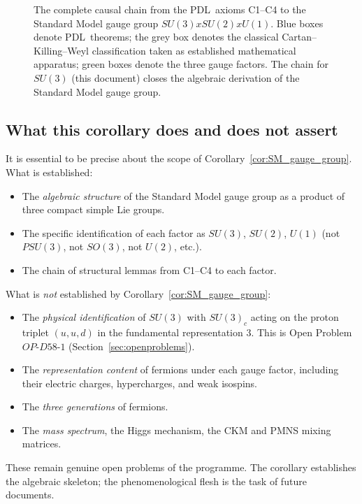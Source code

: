 \documentclass[11pt,a4paper]{article}
\def\SUthree{SU(3)}%
\def\SUtwo{SU(2)}%
\def\Uone{U(1)}%
\def\PSUthree{PSU(3)}%
\def\PDL{PDL}%
\def\times{x}%
\def\mathrm#1{#1}%
\def\mathbf#1{#1}%
\def\textsc#1{#1}%
\theoremstyle{plain}
\theoremstyle{definition}
\theoremstyle{remark}
\newcommand{\PDL}{\textsc{PDL}}
\newcommand{\SUthree}{\mathrm{SU}(3)}
\newcommand{\SUtwo}{\mathrm{SU}(2)}
\newcommand{\Uone}{\mathrm{U}(1)}
\newcommand{\PSUthree}{\mathrm{PSU}(3)}
\begin{document}
\begin{figure}[H]
{%
}
\caption{The complete causal chain from the \PDL\ axioms C1--C4 to the Standard Model gauge group $\SUthree \times \SUtwo \times \Uone$. Blue boxes denote \PDL\ theorems; the grey box denotes the classical Cartan--Killing--Weyl classification taken as established mathematical apparatus; green boxes denote the three gauge factors. The chain for $\SUthree$ (this document) closes the algebraic derivation of the Standard Model gauge group.}
\label{fig:gauge_group_chain}
\end{figure}

\subsection{What this corollary does and does not assert}

It is essential to be precise about the scope of Corollary~\ref{cor:SM_gauge_group}. What is established:
\begin{itemize}[leftmargin=2em]
\item The \emph{algebraic structure} of the Standard Model gauge group as a product of three compact simple Lie groups.
\item The specific identification of each factor as $\SUthree$, $\SUtwo$, $\Uone$ (not $\PSUthree$, not $\mathrm{SO}(3)$, not $\mathrm{U}(2)$, etc.).
\item The chain of structural lemmas from C1--C4 to each factor.
\end{itemize}
What is \emph{not} established by Corollary~\ref{cor:SM_gauge_group}:
\begin{itemize}[leftmargin=2em]
\item The \emph{physical identification} of $\SUthree$ with $\SUthree_{\mathrm{c}}$ acting on the proton triplet $(u,u,d)$ in the fundamental representation $\mathbf{3}$. This is Open Problem $\mathrm{OP\text{-}D58\text{-}1}$ (Section~\ref{sec:openproblems}).
\item The \emph{representation content} of fermions under each gauge factor, including their electric charges, hypercharges, and weak isospins.
\item The \emph{three generations} of fermions.
\item The \emph{mass spectrum}, the Higgs mechanism, the CKM and PMNS mixing matrices.
\end{itemize}
These remain genuine open problems of the programme. The corollary establishes the algebraic skeleton; the phenomenological flesh is the task of future documents.
\end{document}
